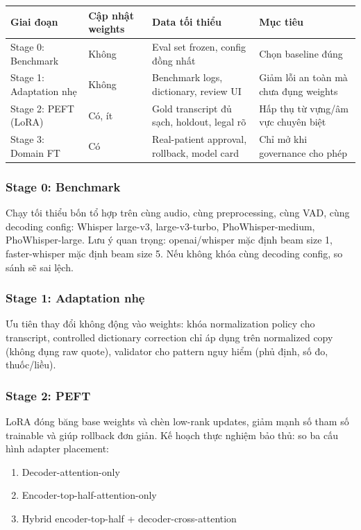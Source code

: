 \begin{longtable}{p{3cm} p{2.5cm} p{4.5cm} p{4cm}}
\toprule
\textbf{Giai đoạn} & \textbf{Cập nhật weights} & \textbf{Data tối thiểu} & \textbf{Mục tiêu} \\
\midrule
Stage 0: Benchmark & Không & Eval set frozen, config đồng nhất & Chọn baseline đúng \\
\midrule
Stage 1: Adaptation nhẹ & Không & Benchmark logs, dictionary, review UI & Giảm lỗi an toàn mà chưa đụng weights \\
\midrule
Stage 2: PEFT (LoRA) & Có, ít & Gold transcript đủ sạch, holdout, legal rõ & Hấp thụ từ vựng/âm vực chuyên biệt \\
\midrule
Stage 3: Domain FT & Có & Real-patient approval, rollback, model card & Chỉ mở khi governance cho phép \\
\bottomrule
\end{longtable}

\subsubsection{Stage 0: Benchmark}

Chạy tối thiểu bốn tổ hợp trên cùng audio, cùng preprocessing, cùng VAD, cùng decoding config: Whisper large-v3, large-v3-turbo, PhoWhisper-medium, PhoWhisper-large. Lưu ý quan trọng: openai/whisper mặc định beam size 1, faster-whisper mặc định beam size 5. Nếu không khóa cùng decoding config, so sánh sẽ sai lệch.

\subsubsection{Stage 1: Adaptation nhẹ}

Ưu tiên thay đổi không động vào weights: khóa normalization policy cho transcript, controlled dictionary correction chỉ áp dụng trên normalized copy (không đụng raw quote), validator cho pattern nguy hiểm (phủ định, số đo, thuốc/liều).

\subsubsection{Stage 2: PEFT}

LoRA đóng băng base weights và chèn low-rank updates, giảm mạnh số tham số trainable và giúp rollback đơn giản. Kế hoạch thực nghiệm bảo thủ: so ba cấu hình adapter placement:
\begin{enumerate}
    \item Decoder-attention-only
    \item Encoder-top-half-attention-only
    \item Hybrid encoder-top-half + decoder-cross-attention
\end{enumerate}

